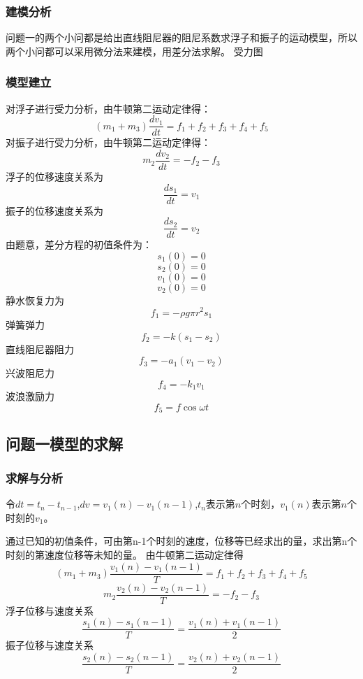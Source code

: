 \documentclass[a4paper,12pt]{article}
\begin{document}
	\subsubsection{建模分析}
	问题一的两个小问都是给出直线阻尼器的阻尼系数求浮子和振子的运动模型，所以两个小问都可以采用微分法来建模，用差分法求解。
	受力图
	\subsubsection{模型建立}
	对浮子进行受力分析，由牛顿第二运动定律得：
	$$(m_1+m_3)\frac{dv_1}{dt}=f_1+f_2+f_3+f_4+f_5$$
	对振子进行受力分析，由牛顿第二运动定律得：
	$$m_2\frac{dv_2}{dt}=-f_2-f_3$$
	浮子的位移速度关系为
	$$\frac{ds_1}{dt}=v_1$$
	振子的位移速度关系为
	$$\frac{ds_2}{dt}=v_2$$
	由题意，差分方程的初值条件为：
	$$s_1(0)=0$$
	$$s_2(0)=0$$
	$$v_1(0)=0$$
	$$v_2(0)=0$$
	静水恢复力为
	$$f_1=-\rho g \pi r^2s_1$$
	弹簧弹力
	$$f_2=-k(s_1-s_2)$$
	直线阻尼器阻力
	$$f_3=-a_1(v_1-v_2)$$
	兴波阻尼力
	$$f_4=-k_1v_1$$
	波浪激励力
	$$f_5=f\cos\omega t$$
	
	\subsection{问题一模型的求解}
	
	\subsubsection{求解与分析}
	令$dt=t_n-t_{n-1}$,$dv=v_1(n)-v_1(n-1)$,$t_n$表示第$n$个时刻，$v_1(n)$表示第$n$个时刻的$v_1$。\par
	通过已知的初值条件，可由第n-1个时刻的速度，位移等已经求出的量，求出第n个时刻的第速度位移等未知的量。
	由牛顿第二运动定律得
	$$(m_1+m_3)\frac{v_1(n)-v_1(n-1)}{T}=f_1+f_2+f_3+f_4+f_5$$
	$$m_2\frac{v_2(n)-v_2(n-1)}{T}=-f_2-f_3$$
	浮子位移与速度关系
	$$\frac{s_1(n)-s_1(n-1)}{T}=\frac{v_1(n)+v_1(n-1)}{2}$$
	振子位移与速度关系
	$$\frac{s_2(n)-s_2(n-1)}{T}=\frac{v_2(n)+v_2(n-1)}{2}$$
\end{document}
